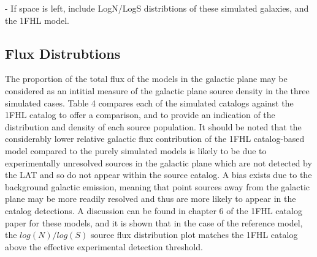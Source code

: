 \documentclass{PoS}
\begin{document}
- If space is left, include LogN/LogS distribtions of these simulated galaxies, and the 1FHL model.

\subsection{Flux Distrubtions}

The proportion of the total flux of the models in the galactic plane may be considered as an intitial measure of the galactic plane source density in the three simulated cases. Table 4 compares each of the simulated catalogs against the 1FHL catalog to offer a comparison, and to provide an indication of the distribution and density of each source population. It should be noted that the considerably lower relative galactic flux contribution of the 1FHL catalog-based model compared to the purely simulated models is likely to be due to experimentally unresolved sources in the galactic plane which are not detected by the LAT and so do not appear within the source catalog. A bias exists due to the background galactic emission, meaning that point sources away from the galactic plane may be more readily resolved and thus are more likely to appear in the catalog detections. A discussion can be found in chapter 6 of the 1FHL catalog paper \cite[p.59]{1fhl} for these models, and it is shown that in the case of the reference model, the $log(N)/log(S)$ source flux distribution plot matches the 1FHL catalog above the effective experimental detection threshold.

\begin{table}
\centering
{}
\caption{Galactic plane fluxes for source population catalogs.}
\end{table}
\end{document}
